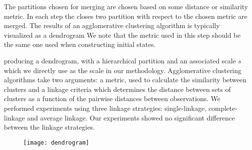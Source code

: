 The partitions chosen for merging are chosen based on some distance or similarity metric. In each step
the closes two partition with respect to the chosen metric are merged. The results of an agglomerative clustering
algorithm is typically visualized as a dendrogram
We note that the metric used in this step should be the same one used when constructing initial states.



producing a dendrogram, with a hierarchical partition and an associated scale $s$ which we directly use
as the scale in our methodology.
Agglomerative clustering algorithms take two arguments: a metric, used to calculate the similarity between 
clusters and a linkage criteria which determines the distance between sets of clusters as a function of the
pairwise distances between observations. We performed experiments using three linkage strategies: single-linkage, 
complete-linkage and average linkage. Our experiments showed no significant difference between the linkage strategies.

\begin{figure}[h!]
	\centering
	\texttt{[image: dendrogram]}
	\caption{}
	\label{fig:dendrogram}
\end{figure}
